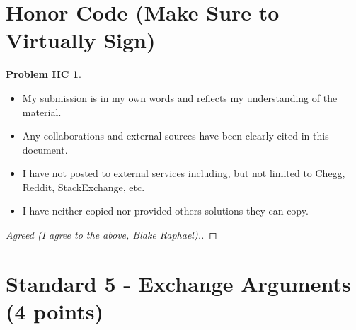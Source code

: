 \documentclass[11pt]{article}
\theoremstyle{definition}
\theoremstyle{definition}
\newtheorem*{requiredHC}{Problem HC}
\theoremstyle{definition}
\begin{document}
\newpage
\section*{Honor Code (Make Sure to Virtually Sign)} \label{HonorCode}
\hypertarget{HonorCode}{}

\begin{requiredHC}
\begin{itemize}
\item My submission is in my own words and reflects my understanding of the material.
\item Any collaborations and external sources have been clearly cited in this document.
\item I have not posted to external services including, but not limited to Chegg, Reddit, StackExchange, etc.
\item I have neither copied nor provided others solutions they can copy.
\end{itemize}

\end{requiredHC}

\begin{proof}[Agreed (I agree to the above, Blake Raphael).]
\end{proof}



\newpage
\setcounter{section}{4}
\section{Standard 5 - Exchange Arguments (4 points)}
\end{document}
